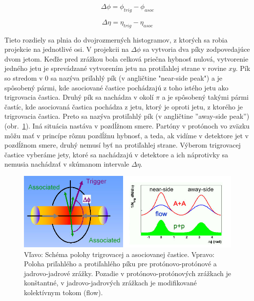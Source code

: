\documentclass[thesismargins, thesislinespacing]{rnthesis}
\begin{document}
\begin{equation}
\Delta \phi = \phi_{trig} - \phi_{asoc}
\end{equation}

\begin{equation}
\Delta \eta = \eta_{trig} - \eta_{asoc}
\end{equation}

Tieto rozdiely sa plnia do dvojrozmerných histogramov, z ktorých sa robia projekcie na jednotlivé osi. V projekcii na $\Delta \phi$ sa vytvoria dva píky zodpovedajúce dvom jetom. Keďže pred zrážkou bola celková priečna hybnosť nulová, vytvorenie jedného jetu je sprevádzané vytvorením jetu na protiľahlej strane v rovine $xy$. Pík  so stredom v 0 sa nazýva priľahlý pík (v angličtine "near-side peak") a je spôsobený pármi, kde asociované častice pochádzajú z toho istého jetu ako trigrovacia častica. Druhý pík sa nachádza v okolí $\pi$ a je spôsobený takými pármi častíc, kde asociovaná častica pochádza z jetu, ktorý je oproti jetu, z ktorého je trigrovacia častica. Preto sa nazýva protiľahlý pík (v angličtine ''away-side peak'')(obr.~\ref{kor}). Iná situácia nastáva v pozdĺžnom smere. Partóny v protónoch vo zväzku môžu mať v princípe rôznu pozdĺžnu hybnosť, a teda, ak vidíme v detektore jet v pozdĺžnom smere, druhý nemusí byť na protiľahlej strane. Výberom trigrovacej častice vyberáme jety, ktoré sa nachádzajú v detektore a ich náprotivky sa nemusia nachádzať v skúmanom intervale $\Delta \eta$.

\begin{figure}[hbtp!]
	\begin{center}
		\includegraphics[width=\textwidth]{./Obrazky_praca/dijetcorrelations.png}
		\caption{Vľavo: Schéma polohy trigrovacej a asociovanej častice. Vpravo: Poloha priľahlého a protiľahlého píku pre protónovo-protónové a jadrovo-jadrové zrážky. Pozadie v protónovo-protónových zrážkach je konštantné, v jadrovo-jadrových zrážkach je \-mo\-di\-fi\-ko\-va\-né kolektívnym tokom (flow).}
		\label{kor}
	\end{center}
\end{figure}
\end{document}
